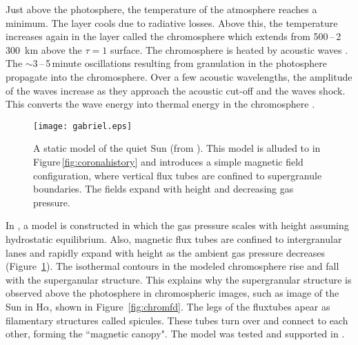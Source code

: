 Just above the photosphere, the temperature of the atmosphere reaches a minimum. The layer cools due to radiative losses. Above this, the temperature increases again in the layer called the chromosphere which extends from 500\,--\,2\,300~km above the $\tau=1$ surface. The chromosphere is heated by acoustic waves \citep{Schatzman:1949}. The $\sim$3\,--\,5\,minute oscillations resulting from granulation in the photosphere propagate into the chromosphere. Over a few acoustic wavelengths, the amplitude of the waves increase as they approach the acoustic cut-off and the waves shock. This converts the wave energy into thermal energy in the chromosphere \citep{Aschwanden:2005}.

\begin{figure}[!t]
\centerline{\texttt{[image: gabriel.eps]}} %
\caption[A static model of the quiet Sun.]{A static model of the quiet Sun (from \citet{Gabriel:1976}). This model is alluded to in Figure\,\ref{fig:coronahistory} and introduces a simple magnetic field configuration, where vertical flux tubes are confined to supergranule boundaries. The fields expand with height and decreasing gas pressure.}
\label{fig:gabmodel}
\end{figure}

In \cite{Gabriel:1976}, a model is constructed in which the gas pressure scales with height assuming hydrostatic equilibrium. Also, magnetic flux tubes are confined to intergranular lanes and rapidly expand with height as the ambient gas pressure decreases (Figure~\ref{fig:gabmodel}). The isothermal contours in the modeled chromosphere rise and fall with the superganular structure. This explains why the supergranular structure is observed above the photosphere in chromospheric images, such as image of the Sun in H$\alpha$, shown in Figure~\ref{fig:chromfd}. The legs of the \glspl{fluxtube} apear as filamentary structures called spicules. These tubes turn over and connect to each other, forming the ``magnetic canopy". The model was tested and supported in \cite{Gallagher:1998}.


